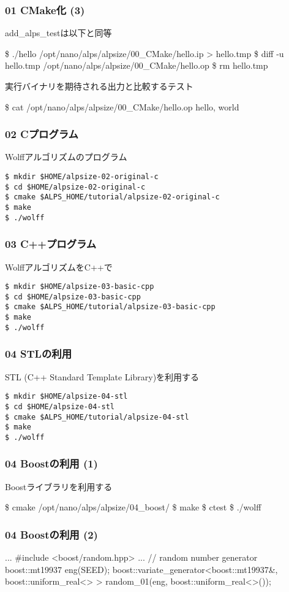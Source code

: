 \begin{frame}[fragile]
  \frametitle{01 CMake化 (3)}
add\_alps\_testは以下と同等
\begin{semiverbatim}
\$ ./hello /opt/nano/alps/alpsize/00_CMake/hello.ip > hello.tmp
\$ diff -u hello.tmp /opt/nano/alps/alpsize/00_CMake/hello.op
\$ rm hello.tmp
\end{semiverbatim}
実行バイナリを期待される出力と比較するテスト
\begin{semiverbatim}
\$ cat /opt/nano/alps/alpsize/00_CMake/hello.op
hello, world
\end{semiverbatim}

\end{frame}

\begin{frame}[fragile]
  \frametitle{02 Cプログラム}
  Wolffアルゴリズムのプログラム
\begin{lstlisting}
$ mkdir $HOME/alpsize-02-original-c
$ cd $HOME/alpsize-02-original-c
$ cmake $ALPS_HOME/tutorial/alpsize-02-original-c
$ make
$ ./wolff
\end{lstlisting}
\end{frame}

\begin{frame}[fragile]
  \frametitle{03 C++プログラム}
  WolffアルゴリズムをC++で
\begin{lstlisting}
$ mkdir $HOME/alpsize-03-basic-cpp
$ cd $HOME/alpsize-03-basic-cpp
$ cmake $ALPS_HOME/tutorial/alpsize-03-basic-cpp
$ make
$ ./wolff
\end{lstlisting}
\end{frame}

\begin{frame}[fragile]
  \frametitle{04 STLの利用}
  STL (C++ Standard Template Library)を利用する
\begin{lstlisting}
$ mkdir $HOME/alpsize-04-stl
$ cd $HOME/alpsize-04-stl
$ cmake $ALPS_HOME/tutorial/alpsize-04-stl
$ make
$ ./wolff
\end{lstlisting}
\end{frame}

\begin{frame}[fragile]
  \frametitle{04 Boostの利用 (1)}
  Boostライブラリを利用する
\begin{semiverbatim}
\$ cmake /opt/nano/alps/alpsize/04_boost/
\$ make
\$ ctest
\$ ./wolff
\end{semiverbatim}
\end{frame}

\begin{frame}[fragile,shrink=10]
  \frametitle{04 Boostの利用 (2)}
\begin{semiverbatim}
...
#include <boost/random.hpp>
...
// random number generator
boost::mt19937 eng(SEED);
boost::variate_generator<boost::mt19937&, boost::uniform_real<> >
random_01(eng, boost::uniform_real<>());
\end{semiverbatim}
\end{frame}

